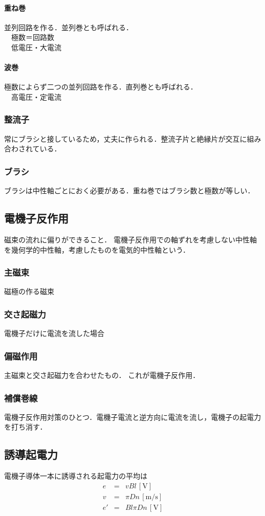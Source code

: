 \paragraph*{重ね巻\\}
並列回路を作る．並列巻とも呼ばれる．\\
　極数＝回路数\\
　低電圧・大電流
\paragraph*{波巻\\}
極数によらず二つの並列回路を作る．直列巻とも呼ばれる．\\
　高電圧・定電流
\subsubsection{整流子}
常にブラシと接しているため，丈夫に作られる．整流子片と絶縁片が交互に組み合わされている．
\subsubsection{ブラシ}
ブラシは中性軸ごとにおく必要がある．重ね巻ではブラシ数と極数が等しい．

\subsection{電機子反作用}
磁束の流れに偏りができること．
電機子反作用での軸ずれを考慮しない中性軸を幾何学的中性軸，考慮したものを電気的中性軸という．
\subsubsection{主磁束}
磁極の作る磁束
\subsubsection{交さ起磁力}
電機子だけに電流を流した場合
\subsubsection{偏磁作用}
主磁束と交さ起磁力を合わせたもの．
これが電機子反作用．
\subsubsection{補償巻線}
電機子反作用対策のひとつ．電機子電流と逆方向に電流を流し，電機子の起電力を打ち消す．

\subsection{誘導起電力}
電機子導体一本に誘導される起電力の平均は
\begin{eqnarray}
  e &=& vBl\, [\textrm{V}] \\
  v &=& \pi Dn\, [\textrm{m/s}] \\
  e' &=& Bl\pi Dn\, [\textrm{V}]
\end{eqnarray}


